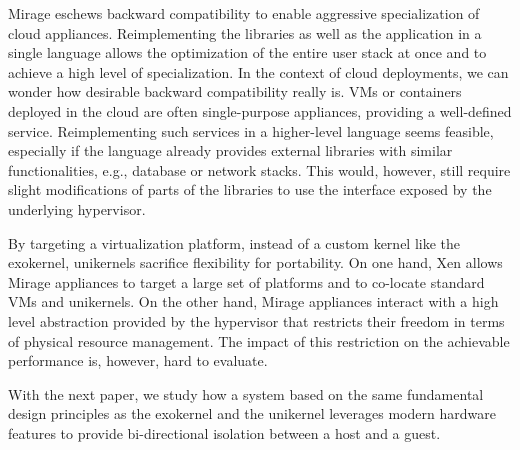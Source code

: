 Mirage eschews backward compatibility to enable aggressive specialization of cloud appliances.
Reimplementing the libraries as well as the application in a single language allows the optimization of the entire user stack at once and to achieve a high level of specialization.
In the context of cloud deployments, we can wonder how desirable backward compatibility really is.
VMs or containers deployed in the cloud are often single-purpose appliances, providing a well-defined service.
Reimplementing such services in a higher-level language seems feasible, especially if the language already provides external libraries with similar functionalities, e.g., database or network stacks.
This would, however, still require slight modifications of parts of the libraries to use the interface exposed by the underlying hypervisor.

By targeting a virtualization platform, instead of a custom kernel like the exokernel, unikernels sacrifice flexibility for portability.
On one hand, Xen allows Mirage appliances to target a large set of platforms and to co-locate standard VMs and unikernels.
On the other hand, Mirage appliances interact with a high level abstraction provided by the hypervisor that restricts their freedom in terms of physical resource management.
The impact of this restriction on the achievable performance is, however, hard to evaluate.

With the next paper, we study how a system based on the same fundamental design principles as the exokernel and the unikernel leverages modern hardware features to provide bi-directional isolation between a host and a guest.


